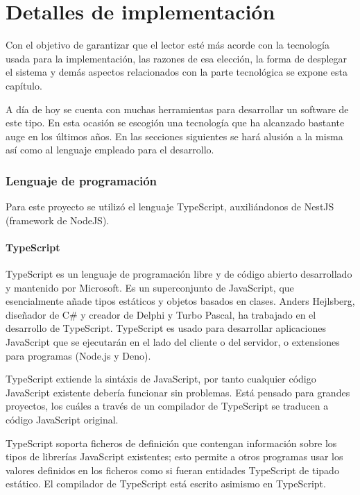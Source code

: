 \chapter{Detalles de implementación}\label{cap:implementation_details}

Con el objetivo de garantizar que el lector esté más acorde con la tecnología usada para la implementación, las razones de esa elección, la forma de desplegar el sistema y demás aspectos relacionados con la parte tecnológica se expone esta capítulo.

A día de hoy se cuenta con muchas herramientas para desarrollar un software de este tipo. En esta ocasión se escogión una tecnología que ha alcanzado bastante auge en los últimos años. En las secciones siguientes se hará alusión a la misma así como al lenguaje empleado para el desarrollo.

\subsection{Lenguaje de programación}
Para este proyecto se utilizó el lenguaje TypeScript, auxiliándonos de NestJS (framework de NodeJS).

\subsubsection{TypeScript}\cite{wiki_ts}

TypeScript es un lenguaje de programación libre y de código abierto desarrollado y mantenido por Microsoft. Es un superconjunto de JavaScript, que esencialmente añade tipos estáticos y objetos basados en clases. Anders Hejlsberg, diseñador de C\# y creador de Delphi y Turbo Pascal, ha trabajado en el desarrollo de TypeScript. TypeScript es usado para desarrollar aplicaciones JavaScript que se ejecutarán en el lado del cliente o del servidor, o extensiones para programas (Node.js y Deno).

TypeScript extiende la sintáxis de JavaScript, por tanto cualquier código JavaScript existente debería  funcionar sin problemas. Está pensado para grandes proyectos, los cuáles a través de un compilador de TypeScript se traducen a código JavaScript original. 

TypeScript soporta ficheros de definición que contengan información sobre los tipos de librerías JavaScript existentes; esto permite a otros programas usar los valores definidos en los ficheros como si fueran entidades TypeScript de tipado estático. El compilador de TypeScript está escrito asimismo en TypeScript. 


